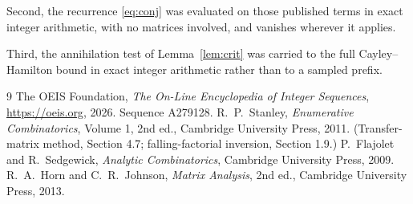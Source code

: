 \documentclass[11pt,a4paper]{article}
\theoremstyle{plain}
\theoremstyle{definition}
\begin{document}
Second, the recurrence \eqref{eq:conj} was evaluated on those published terms in exact
integer arithmetic, with no matrices involved, and vanishes wherever it applies.

Third, the annihilation test of Lemma~\ref{lem:crit} was carried to the full
Cayley--Hamilton bound in exact integer arithmetic rather than to a sampled prefix.

\begin{thebibliography}{9}
 The OEIS Foundation, \emph{The On-Line Encyclopedia of Integer
Sequences}, \url{https://oeis.org}, 2026. Sequence A279128.
 R.~P.~Stanley, \emph{Enumerative Combinatorics}, Volume 1, 2nd ed.,
Cambridge University Press, 2011. (Transfer-matrix method, Section 4.7; falling-factorial
inversion, Section 1.9.)
 P.~Flajolet and R.~Sedgewick, \emph{Analytic Combinatorics}, Cambridge
University Press, 2009.
 R.~A.~Horn and C.~R.~Johnson, \emph{Matrix Analysis}, 2nd ed., Cambridge
University Press, 2013.
\end{thebibliography}
\end{document}
